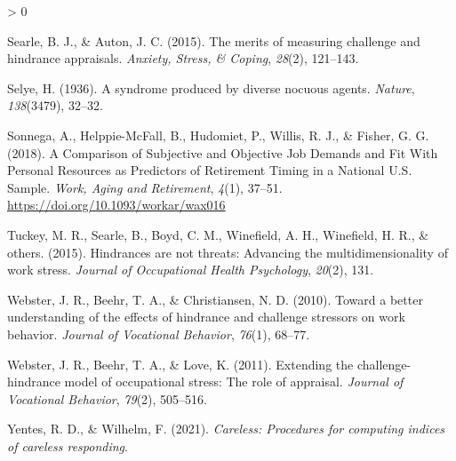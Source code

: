 \documentclass[
  english,
  man]{apa6}
\newlength{\cslhangindent}
\newenvironment{CSLReferences}[2] %
 {%
  \setlength{\parindent}{0pt}
  \ifodd #1 \everypar{\setlength{\hangindent}{\cslhangindent}}\ignorespaces\fi
  \ifnum #2 > 0
  \setlength{\parskip}{#2\baselineskip}
  \fi
 }%
 {}
\begin{document}
\begin{CSLReferences}{1}{0}
\leavevmode\hypertarget{ref-searle2015merits}{}%
Searle, B. J., \& Auton, J. C. (2015). The merits of measuring challenge and hindrance appraisals. \emph{Anxiety, Stress, \& Coping}, \emph{28}(2), 121--143.

\leavevmode\hypertarget{ref-selye1936syndrome}{}%
Selye, H. (1936). A syndrome produced by diverse nocuous agents. \emph{Nature}, \emph{138}(3479), 32--32.

\leavevmode\hypertarget{ref-sonnega_comparison_2018}{}%
Sonnega, A., Helppie-McFall, B., Hudomiet, P., Willis, R. J., \& Fisher, G. G. (2018). A {Comparison} of {Subjective} and {Objective} {Job} {Demands} and {Fit} {With} {Personal} {Resources} as {Predictors} of {Retirement} {Timing} in a {National} {U}.{S}. {Sample}. \emph{Work, Aging and Retirement}, \emph{4}(1), 37--51. \url{https://doi.org/10.1093/workar/wax016}

\leavevmode\hypertarget{ref-tuckey2015hindrances}{}%
Tuckey, M. R., Searle, B., Boyd, C. M., Winefield, A. H., Winefield, H. R., \& others. (2015). Hindrances are not threats: Advancing the multidimensionality of work stress. \emph{Journal of Occupational Health Psychology}, \emph{20}(2), 131.

\leavevmode\hypertarget{ref-webster2010toward}{}%
Webster, J. R., Beehr, T. A., \& Christiansen, N. D. (2010). Toward a better understanding of the effects of hindrance and challenge stressors on work behavior. \emph{Journal of Vocational Behavior}, \emph{76}(1), 68--77.

\leavevmode\hypertarget{ref-webster2011extending}{}%
Webster, J. R., Beehr, T. A., \& Love, K. (2011). Extending the challenge-hindrance model of occupational stress: The role of appraisal. \emph{Journal of Vocational Behavior}, \emph{79}(2), 505--516.

\leavevmode\hypertarget{ref-R-careless}{}%
Yentes, R. D., \& Wilhelm, F. (2021). \emph{Careless: Procedures for computing indices of careless responding}.

\end{CSLReferences}

\endgroup
\end{document}
